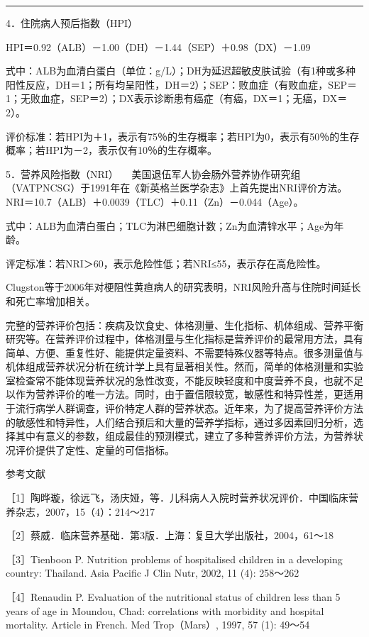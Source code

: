 \begin{center}\rule{0.5\linewidth}{\linethickness}\end{center}

{4．住院病人预后指数（HPI）}

HPI＝0.92（ALB）－1.00（DH）－1.44（SEP）＋0.98（DX）－1.09

式中：ALB为血清白蛋白（单位：g/L）；DH为延迟超敏皮肤试验（有1种或多种阳性反应，DH＝1；所有均呈阳性，DH＝2）；SEP：败血症（有败血症，SEP＝1；无败血症，SEP＝2）；DX表示诊断患有癌症（有癌，DX＝1；无癌，DX＝2）。

评价标准：若HPI为＋1，表示有75％的生存概率；若HPI为0，表示有50％的生存概率；若HPI为－2，表示仅有10％的生存概率。

{5．营养风险指数（NRI）}
　美国退伍军人协会肠外营养协作研究组（VATPNCSG）于1991年在《新英格兰医学杂志》上首先提出NRI评价方法。NRI＝10.7（ALB）＋0.0039（TLC）＋0.11（Zn）－0.044（Age）。

式中：ALB为血清白蛋白；TLC为淋巴细胞计数；Zn为血清锌水平；Age为年龄。

评定标准：若NRI＞60，表示危险性低；若NRI≤55，表示存在高危险性。

Clugston等于2006年对梗阻性黄疸病人的研究表明，NRI风险升高与住院时间延长和死亡率增加相关。

完整的营养评价包括：疾病及饮食史、体格测量、生化指标、机体组成、营养平衡研究等。在营养评价过程中，体格测量与生化指标是营养评价的最常用方法，具有简单、方便、重复性好、能提供定量资料、不需要特殊仪器等特点。很多测量值与机体组成营养状况分析在统计学上具有显著相关性。然而，简单的体格测量和实验室检查常不能体现营养状况的急性改变，不能反映轻度和中度营养不良，也就不足以作为营养评价的唯一方法。同时，由于置信限较宽，敏感性和特异性差，更适用于流行病学人群调查，评价特定人群的营养状态。近年来，为了提高营养评价方法的敏感性和特异性，人们结合预后和大量的营养学指标，通过多因素回归分析，选择其中有意义的参数，组成最佳的预测模式，建立了多种营养评价方法，为营养状况评价提供了定性、定量的可信指标。

{参考文献}

［1］陶晔璇，徐远飞，汤庆娅，等．儿科病人入院时营养状况评价．中国临床营养杂志，2007，15（4）：214～217

［2］蔡威．临床营养基础．第3版．上海：复旦大学出版社，2004，61～18

［3］Tienboon P. Nutrition problems of hospitalised children in a
developing country: Thailand. Asia Pacific J Clin Nutr, 2002, 11 (4):
258～262

［4］Renaudin P. Evaluation of the nutritional status of children less
than 5 years of age in Moundou, Chad: correlations with morbidity and
hospital mortality. Article in French. Med Trop（Mars）, 1997, 57 (1):
49～54


